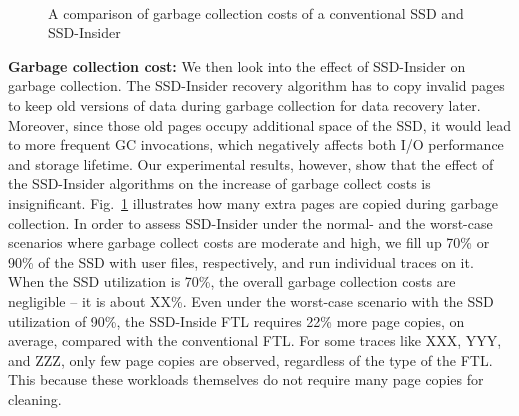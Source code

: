 \documentclass[conference]{IEEEtran}
\newcommand{\ours}{SSD-Insider}
\begin{document}
\begin{figure}[t] 
	\centering 
	 \\
	\caption{A comparison of garbage collection costs of
	a conventional SSD and \ours{}} 
	\label{fig:flash-gc-cost} 
\end{figure}

{\color{red}
{\noindent\bf Garbage collection cost:}
We then look into the effect of \ours{} on garbage collection.
The \ours{} recovery algorithm has to copy invalid pages to
keep old versions of data during garbage collection for data
recovery later. Moreover, since those old pages occupy additional
space of the SSD, it would lead to more frequent GC invocations,
which negatively affects both I/O performance and storage lifetime.
Our experimental results, however, show that the effect of the
\ours{} algorithms on the increase of garbage collect costs is
insignificant.  Fig.~\ref{fig:flash-gc-cost} illustrates how many
extra pages are copied during garbage collection.  In order to
assess \ours{} under the normal- and the worst-case scenarios
where garbage collect costs are moderate and high, we fill up 70\%
or 90\% of the SSD with user files, respectively, and run
individual traces on it.  When the SSD utilization is 70\%, the
overall garbage collection costs are negligible -- it is about
{\color{red}XX\%}.  Even under the worst-case scenario with the SSD utilization
of 90\%, the SSD-Inside FTL requires 22\% more page copies, on
average, compared with the conventional FTL. For some traces like
{\color{red}XXX, YYY, and ZZZ,} only few page copies are observed,
regardless of the type of the FTL. This because these workloads
themselves do not require many page copies for cleaning.
}
\end{document}
